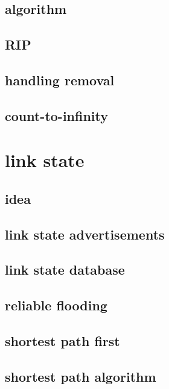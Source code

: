 \subsection{algorithm}


\subsection{RIP}



\subsection{handling removal}

\subsection{count-to-infinity}

\section{link state}
\subsection{idea}

\subsection{link state advertisements}

\subsection{link state database}

\subsection{reliable flooding}


\subsection{shortest path first}



\subsection{shortest path algorithm}


